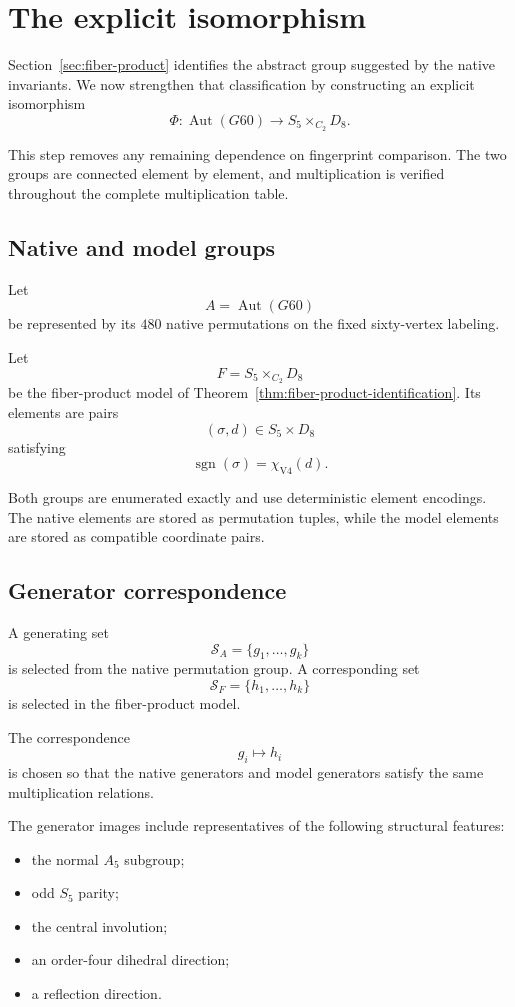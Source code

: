 \section{The explicit isomorphism}
\label{sec:explicit-isomorphism}

Section~\ref{sec:fiber-product} identifies the abstract group suggested
by the native invariants. We now strengthen that classification by
constructing an explicit isomorphism
\[
\Phi\colon
\operatorname{Aut}(G60)
\longrightarrow
S_5\times_{C_2}D_8.
\]

This step removes any remaining dependence on fingerprint comparison.
The two groups are connected element by element, and multiplication is
verified throughout the complete multiplication table.

\subsection{Native and model groups}

Let
\[
A=\operatorname{Aut}(G60)
\]
be represented by its $480$ native permutations on the fixed
sixty-vertex labeling.

Let
\[
F=S_5\times_{C_2}D_8
\]
be the fiber-product model of
Theorem~\ref{thm:fiber-product-identification}. Its elements are pairs
\[
(\sigma,d)\in S_5\times D_8
\]
satisfying
\[
\operatorname{sgn}(\sigma)=\chi_{\mathrm{V4}}(d).
\]

Both groups are enumerated exactly and use deterministic element
encodings. The native elements are stored as permutation tuples, while
the model elements are stored as compatible coordinate pairs.

\subsection{Generator correspondence}

A generating set
\[
\mathcal{S}_A=\{g_1,\ldots,g_k\}
\]
is selected from the native permutation group. A corresponding set
\[
\mathcal{S}_F=\{h_1,\ldots,h_k\}
\]
is selected in the fiber-product model.

The correspondence
\[
g_i\longmapsto h_i
\]
is chosen so that the native generators and model generators satisfy the
same multiplication relations.

The generator images include representatives of the following
structural features:

\begin{itemize}
\item the normal $A_5$ subgroup;
\item odd $S_5$ parity;
\item the central involution;
\item an order-four dihedral direction;
\item a reflection direction.
\end{itemize}

